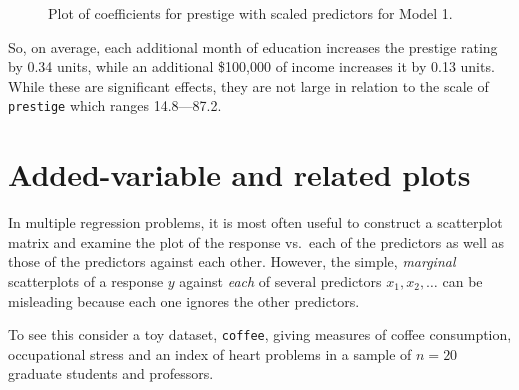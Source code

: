 \documentclass[
  letterpaper,
  10pt,
  krantz2]{krantz}
\begin{document}
\begin{figure}[H]


\caption{\label{fig-ggcoef-compare2}Plot of coefficients for prestige
with scaled predictors for Model 1.}

\end{figure}%

So, on average, each additional month of education increases the
prestige rating by 0.34 units, while an additional \$100,000 of income
increases it by 0.13 units. While these are significant effects, they
are not large in relation to the scale of \texttt{prestige} which ranges
14.8---87.2.

\section{Added-variable and related plots}\label{sec-avplots}

In multiple regression problems, it is most often useful to construct a
scatterplot matrix and examine the plot of the response vs.~each of the
predictors as well as those of the predictors against each other.
However, the simple, \emph{marginal} scatterplots of a response \(y\)
against \emph{each} of several predictors \(x_1, x_2, \dots\) can be
misleading because each one ignores the other predictors.

To see this consider a toy dataset, \texttt{coffee}, giving measures of
coffee consumption, occupational stress and an index of heart problems
in a sample of \(n=20\) graduate students and professors.
\end{document}
